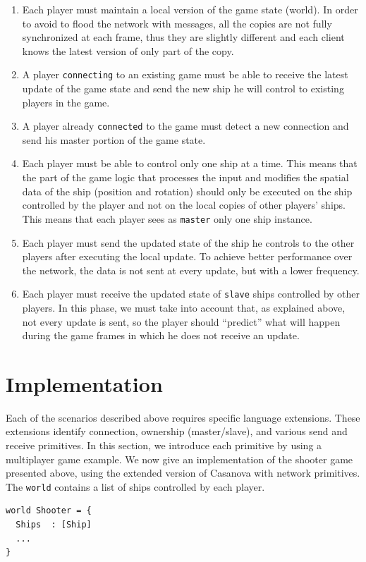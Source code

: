 \begin{enumerate}
	\item Each player must maintain a local version of the game state (world). In order to avoid to flood the network with messages, all the copies are not fully synchronized at each frame, thus they are slightly different and each client knows the latest version of only part of the copy.
	\item A player \texttt{connecting} to an existing game must be able to receive the latest update of the game state and send the new ship he will control to existing players in the game.
	\item A player already \texttt{connected} to the game must detect a new connection and send his master portion of the game state.
	\item Each player must be able to control only one ship at a time. This means that the part of the game logic that processes the input and modifies the spatial data of the ship (position and rotation) should only be executed on the ship controlled by the player and not on the local copies of other players' ships. This means that each player sees as \texttt{master} only one ship instance.
	\item Each player must send the updated state of the ship he controls to the other players after executing the local update. To achieve better performance over the network, the data is not sent at every update, but with a lower frequency.
	\item Each player must receive the updated state of \texttt{slave} ships controlled by other players. In this phase, we must take into account that, as explained above, not every update is sent, so the player should ``predict'' what will happen during the game frames in which he does not receive an update.
\end{enumerate}

\section{Implementation}
\label{sec:ch_networking_casanova_networking_primitives}
Each of the scenarios described above requires specific language extensions. These extensions identify connection, ownership (master/slave), and various send and receive primitives. In this section, we introduce each primitive by using a multiplayer game example. We now give an implementation of the shooter game presented above, using the extended version of Casanova with network primitives. The \texttt{world} contains a list of ships controlled by each player.
\begin{lstlisting}
world Shooter = {
  Ships  : [Ship]
  ...
}
\end{lstlisting}

